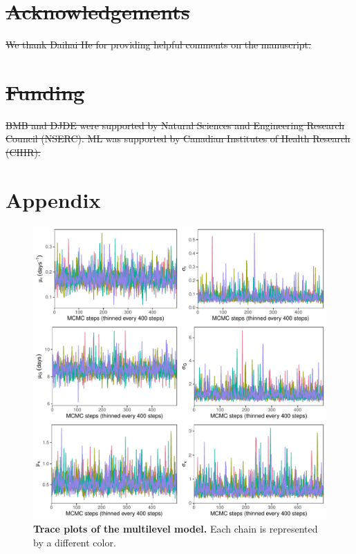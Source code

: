 \documentclass[12pt]{article}
\providecommand{\DIFdeltex}[1]{{\protect\color{red}\sout{#1}}}                      %
\providecommand{\DIFaddbegin}{} %
\providecommand{\DIFaddend}{} %
\providecommand{\DIFdelbegin}{} %
\providecommand{\DIFdelend}{} %
\providecommand{\DIFdel}[1]{\texorpdfstring{\DIFdeltex{#1}}{}} %
\newcommand{\DIFscaledelfig}{0.5}
\newlength{\DIFdelgraphicswidth} %
\newlength{\DIFdelgraphicsheight} %
\newcommand{\DIFaddincludegraphics}[2][]{{\color{blue}\fbox{\DIFOincludegraphics[#1]{#2}}}} %
\newcommand{\DIFdelincludegraphics}[2][]{%
\sbox{\DIFdelgraphicsbox}{\DIFOincludegraphics[#1]{#2}}%
\settoboxwidth{\DIFdelgraphicswidth}{\DIFdelgraphicsbox} %
\settoboxtotalheight{\DIFdelgraphicsheight}{\DIFdelgraphicsbox} %
\scalebox{\DIFscaledelfig}{%
\parbox[b]{\DIFdelgraphicswidth}{\usebox{\DIFdelgraphicsbox}\\[-\baselineskip] \rule{\DIFdelgraphicswidth}{0em}}\llap{\resizebox{\DIFdelgraphicswidth}{\DIFdelgraphicsheight}{%
\setlength{\unitlength}{\DIFdelgraphicswidth}%
\begin{picture}(1,1)%
\thicklines\linethickness{2pt} %
{\color[rgb]{1,0,0}\put(0,0){\framebox(1,1){}}}%
{\color[rgb]{1,0,0}\put(0,0){\line( 1,1){1}}}%
{\color[rgb]{1,0,0}\put(0,1){\line(1,-1){1}}}%
\end{picture}%
}\hspace*{3pt}}} %
} %
\DeclareRobustCommand{\DIFaddbegin}{\DIFOaddbegin \let\includegraphics\DIFaddincludegraphics} %
\DeclareRobustCommand{\DIFaddend}{\DIFOaddend \let\includegraphics\DIFOincludegraphics} %
\DeclareRobustCommand{\DIFdelbegin}{\DIFOdelbegin \let\includegraphics\DIFdelincludegraphics} %
\DeclareRobustCommand{\DIFdelend}{\DIFOaddend \let\includegraphics\DIFOincludegraphics} %
\begin{document}
\section*{\DIFdel{Acknowledgements}}

\DIFdel{We thank Daihai He for providing helpful comments on the manuscript.
}%

\section*{\DIFdel{Funding}}

\DIFdel{BMB and DJDE were supported by Natural Sciences and Engineering Research Council (NSERC). ML was supported by Canadian Institutes of Health Research (CIHR).
}%

\DIFdelend \pagebreak

\DIFdelbegin %
\DIFdelend \DIFaddbegin 
\DIFaddend 

\pagebreak
\appendix
\renewcommand\thefigure{A\arabic{figure}}
\setcounter{figure}{0}    
\section*{Appendix}

\begin{figure}[!h]
\includegraphics[width=\textwidth]{posterior_chain.pdf}
\caption{
\textbf{Trace plots of the multilevel model.}
Each chain is represented by a different color.
}
\end{figure}
\end{document}
